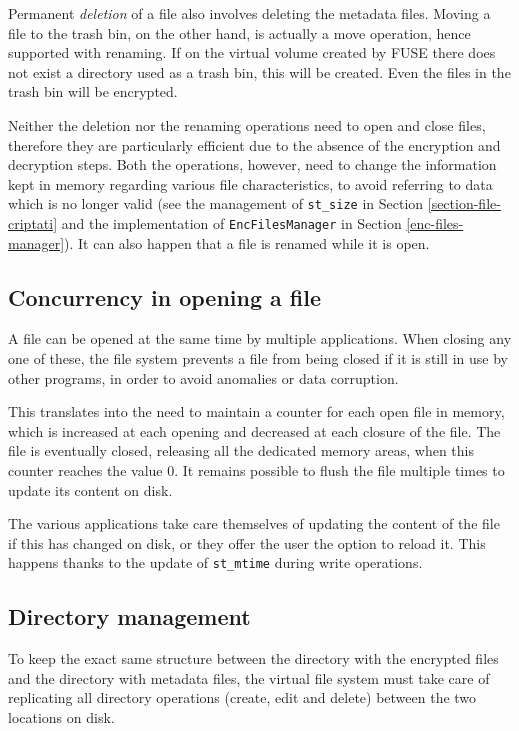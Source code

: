 \documentclass[a4paper,12pt,twoside,openright]{report}
\begin{document}
  Permanent \textit{deletion} of a file also involves deleting the metadata files. Moving a file
  to the trash bin, on the other hand, is actually a move operation, hence supported with renaming.
  If on the virtual volume created by FUSE there does not exist a directory used as a trash bin,
  this will be created. Even the files in the trash bin will be encrypted.
  
  Neither the deletion nor the renaming operations need to open and close files, therefore they are
  particularly efficient due to the absence of the encryption and decryption steps.
  Both the operations, however, need to change the information kept in memory regarding various file
  characteristics, to avoid referring to data which is no longer valid
  (see the management of \texttt{st\_size} in Section \ref{section-file-criptati} and the implementation
  of \texttt{EncFilesManager} in Section \ref{enc-files-manager}).
  It can also happen that a file is renamed while it is open.

  \subsection{Concurrency in opening a file}
  \label{aperture-multiple-file}

  A file can be opened at the same time by multiple applications. When closing any one of
  these, the file system prevents a file from being closed if it is still in use by other programs,
  in order to avoid anomalies or data corruption.

  This translates into the need to maintain a counter for each open file in memory, which is increased
  at each opening and decreased at each closure of the file.
  The file is eventually closed, releasing all the dedicated memory areas, when this counter reaches the value 0.
  It remains possible to flush the file multiple times to update its content on disk.

  The various applications take care themselves of updating the content of the file if this has
  changed on disk, or they offer the user the option to reload it.
  This happens thanks to the update of \texttt{st\_mtime} during write operations.

  \subsection{Directory management}

  To keep the exact same structure between the directory with the encrypted files and
  the directory with metadata files, the virtual file system must take care of replicating
  all directory operations (create, edit and delete) between the two locations on disk.
\end{document}
